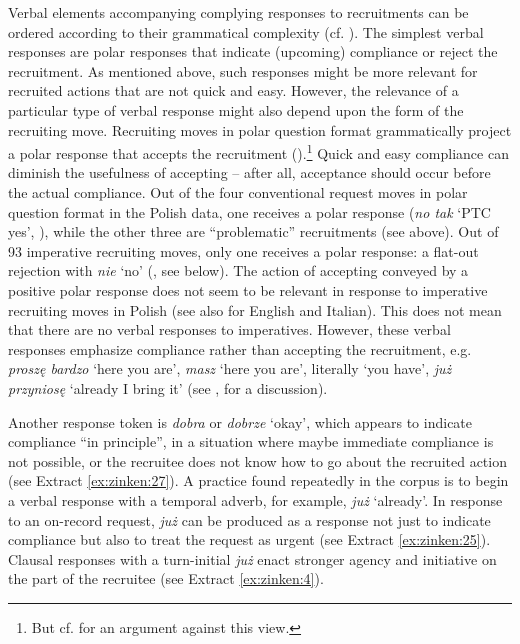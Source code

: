\documentclass[output=paper]{langsci/langscibook}
\begin{document}
Verbal elements accompanying complying responses to recruitments can be ordered according to their grammatical complexity (cf. \citealt{ThompsonFoxCouperKuhlen2015}). The simplest verbal responses are polar responses that indicate (upcoming) compliance or reject the recruitment.  As mentioned above, such responses might be more relevant for recruited actions that are not quick and easy.  However, the relevance of a particular type of verbal response might also depend upon the form of the recruiting move.  Recruiting moves in polar question format grammatically project a polar response that accepts the recruitment (\citealt{Raymond2003}).\footnote{But cf. \citet{ThompsonFoxCouperKuhlen2015} for an argument against this view.} Quick and easy compliance can diminish the usefulness of accepting -- after all, acceptance should occur before the actual compliance. Out of the four conventional request moves in polar question format in the Polish data, one receives a polar response (\textit{no tak} `\textsc{PTC} yes', ), while the other three are “problematic” recruitments (see  above).  Out of 93 imperative recruiting moves, only one receives a polar response: a flat-out rejection with \textit{nie} `no' (, see below).  The action of accepting conveyed by a positive polar response does not seem to be relevant in response to imperative recruiting moves in Polish (see also \citealt{CravenPotter2010,Rossi2012} for English and Italian). This does not mean that there are no verbal responses to imperatives. However, these verbal responses emphasize compliance rather than accepting the recruitment, e.g. \textit{proszę bardzo} `here you are', \textit{masz} ‘here you are’, literally `you have', \textit{już przyniosę} `already I bring it' (see \citealt[chap. 5]{Zinken2016}, for a discussion). 

Another response token is \textit{dobra} or \textit{dobrze} `okay', which appears to indicate compliance “in principle”, in a situation where maybe immediate compliance is not possible, or the recruitee does not know how to go about the recruited action (see Extract \ref{ex:zinken:27}).  A practice found repeatedly in the corpus is to begin a verbal response with a temporal adverb, for example, \textit{już} `already'.  In response to an on-record request, \textit{już} can be produced as a response not just to indicate compliance but also to treat the request as urgent (see Extract \ref{ex:zinken:25}).  Clausal responses with a turn-initial \textit{już} enact stronger agency and initiative on the part of the recruitee (see Extract \ref{ex:zinken:4}).
\end{document}
